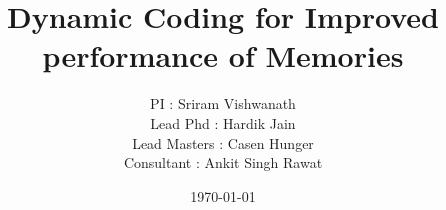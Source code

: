 \documentclass[12pt,single-column]{article}
\begin{document}
\title{Dynamic Coding for Improved performance of Memories }
\author{
PI : Sriram Vishwanath\\
Lead Phd : Hardik Jain\\
Lead Masters : Casen Hunger \\
Consultant : Ankit Singh Rawat 
}

\date{\normalsize\today}  %

\maketitle
\begin{comment}
\begin{abstract}
 
\end{abstract}
\section{Introduction}
\label{sec:intro}
 {intro}

\section{Main Results}
\label{sec:main_results}

\subsection{Coding Theory for Storage}
\label{sec:coding_theory_for_storage}
 {coding_theory_for_memory}

\subsection{Design Parameters}
\label{sec:design_parameters}
 {design_parameters}

\subsection{Code Design}
\label{sec:code_design}
 {code_design}

\subsection{Coding Performance Enhancement}
\label{sec:coding_performance_enhancement}
 {coding_performance_enhancement}
\end{comment}
\end{document}
